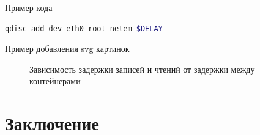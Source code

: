 \documentclass[14pt]{extarticle}
\begin{document}
Пример кода
\begin{lstlisting}[language=bash, label=delay,caption={Добавление задержки}]
  qdisc add dev eth0 root netem $DELAY
\end{lstlisting}

Пример добавления svg картинок

\begin{figure}[H]
  \centering
    \qquad
    \caption{Зависимость задержки записей и чтений от задержки между контейнерами}
\end{figure}

\pagebreak
\section{Заключение}\label{part6}

\pagebreak

\renewcommand{\refname}{Библиографический список}

\end{document}
